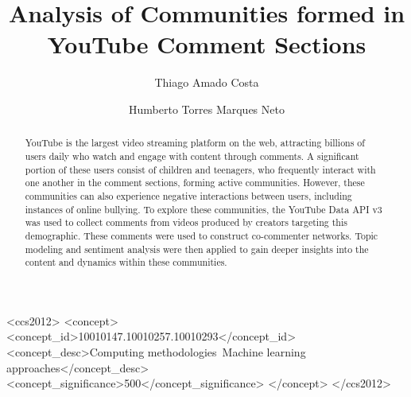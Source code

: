 \documentclass[sigconf]{acmart}
\begin{document}
\title{Analysis of Communities formed in YouTube Comment Sections}


\author{Thiago Amado Costa}
\authornotemark[1]

\author{Humberto Torres Marques Neto}
\authornotemark[2]


\renewcommand{\shortauthors}{Costa and Marques-Neto}

\begin{abstract}
    YouTube is the largest video streaming platform on the web, attracting billions of users 
    daily who watch and engage with content through comments. 
    A significant portion of these users consist of children and teenagers, who frequently interact 
    with one another in the comment sections, forming active communities. 
    However, these communities can also experience negative interactions between users, 
    including instances of online bullying.
    To explore these communities, the YouTube Data API v3 was used to collect comments 
    from videos produced by creators targeting this demographic. These comments were used to construct 
    co-commenter networks.
    Topic modeling and sentiment analysis were then applied to gain deeper insights into the  
    content and dynamics within these communities.
\end{abstract}

\begin{CCSXML}
<ccs2012>
   <concept>
       <concept_id>10010147.10010257.10010293</concept_id>
       <concept_desc>Computing methodologies~Machine learning approaches</concept_desc>
       <concept_significance>500</concept_significance>
       </concept>
 </ccs2012>
\end{CCSXML}
\end{document}
